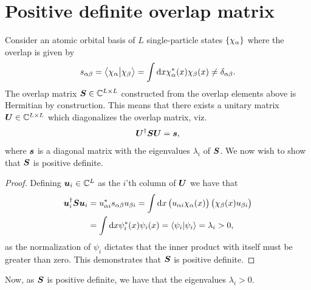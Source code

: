     \section{Positive definite overlap matrix}
        \label{app:positive-definite-overlap}
        Consider an atomic orbital basis of $L$ single-particle states
        $\left\{ \chi_{\alpha} \right\}$ where the overlap is given by
        \begin{align}
            s_{\alpha\beta}
            = \braket{\chi_{\alpha}}{\chi_{\beta}}
            = \int\dd x \chi^{*}_{\alpha}(x)\chi_{\beta}(x)
            \neq \delta_{\alpha\beta}.
        \end{align}
        The overlap matrix $\boldsymbol{S} \in \mathbb{C}^{L \times L}$ constructed
        from the overlap elements above is Hermitian by construction.
        This means that there exists a unitary matrix $\boldsymbol{U} \in \mathbb{C}^{L
        \times L}$ which diagonalizes the overlap matrix, viz.
        \begin{align}
            \boldsymbol{U}^{\dagger}\boldsymbol{S}\boldsymbol{U}
            = \boldsymbol{s},
        \end{align}
        where $\boldsymbol{s}$ is a diagonal matrix with the eigenvalues $\lambda_i$ of
        $\boldsymbol{S}$.
        We now wish to show that $\boldsymbol{S}$ is positive definite.
        \begin{proof}
            Defining $\boldsymbol{u}_{i} \in \mathbb{C}^{L}$ as the $i$'th column of
            $\boldsymbol{U}$ we have that
            \begin{align}
                \boldsymbol{u}_{i}^{\dagger}\boldsymbol{S}\boldsymbol{u}_i
                &= u^{*}_{\alpha i}
                s_{\alpha\beta}
                u_{\beta i}
                = \int\dd x
                \left( 
                    u_{\alpha i}
                    \chi_{\alpha}(x)
                 \right)
                \left( 
                    \chi_{\beta}(x)
                    u_{\beta i}
                 \right)
                \\
                &=
                \int \dd x
                \psi^{*}_i(x)
                \psi_i(x)
                =
                \braket{\psi_i}{\psi_i}
                = \lambda_i
                > 0,
            \end{align}
            as the normalization of $\psi_i$ dictates that the inner product with
            itself must be greater than zero.
            This demonstrates that $\boldsymbol{S}$ is positive definite.
        \end{proof}
        Now, as $\boldsymbol{S}$ is positive definite, we have that the eigenvalues
        $\lambda_i > 0$.

